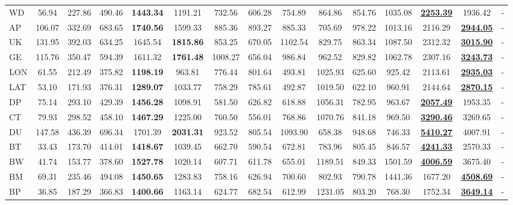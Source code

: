 \begin{table*}[htbp]
\begin{tabular}{@{}l *{14}{c}@{}}
WD & 56.94 & 227.86 & 490.46 & \textbf{1443.34} & 1191.21 & 732.56 & 606.28 & 754.89 & 864.86 & 854.76 & 1035.08 & \underline{\textbf{2253.39}} & 1936.42 & - \\
AP & 106.07 & 332.69 & 683.65 & \textbf{1740.56} & 1599.33 & 885.36 & 893.27 & 885.33 & 705.69 & 978.22 & 1013.16 & 2116.29 & \underline{\textbf{2944.05}} & - \\
UK & 131.95 & 392.03 & 634.25 & 1645.54 & \textbf{1815.86} & 853.25 & 670.05 & 1102.54 & 829.75 & 863.34 & 1087.50 & 2312.32 & \underline{\textbf{3015.90}} & - \\
GE & 115.76 & 350.47 & 594.39 & 1611.32 & \textbf{1761.48} & 1008.27 & 656.04 & 986.84 & 962.52 & 829.82 & 1062.78 & 2307.16 & \underline{\textbf{3243.73}} & - \\
LON & 61.55 & 212.49 & 375.82 & \textbf{1198.19} & 963.81 & 776.44 & 801.64 & 493.81 & 1025.93 & 625.60 & 925.42 & 2113.61 & \underline{\textbf{2935.03}} & - \\
LAT & 53.10 & 171.93 & 376.31 & \textbf{1289.07} & 1033.77 & 758.29 & 785.61 & 492.87 & 1019.50 & 622.10 & 960.91 & 2144.64 & \underline{\textbf{2870.15}} & - \\
DP & 75.14 & 293.10 & 429.39 & \textbf{1456.28} & 1098.91 & 581.50 & 626.82 & 618.88 & 1056.31 & 782.95 & 963.67 & \underline{\textbf{2057.49}} & 1953.35 & - \\
CT & 79.93 & 298.52 & 458.10 & \textbf{1467.29} & 1225.00 & 760.50 & 556.01 & 768.86 & 1070.76 & 841.18 & 969.50 & \underline{\textbf{3290.46}} & 3269.65 & - \\
DU & 147.58 & 436.39 & 696.34 & 1701.39 & \textbf{2031.31} & 923.52 & 805.54 & 1093.90 & 658.38 & 948.68 & 746.33 & \underline{\textbf{5410.27}} & 4007.91 & - \\
BT & 33.43 & 173.70 & 414.01 & \textbf{1418.67} & 1039.45 & 662.70 & 590.54 & 672.81 & 783.96 & 805.45 & 846.57 & \underline{\textbf{4241.33}} & 2570.33 & - \\
BW & 41.74 & 153.77 & 378.60 & \textbf{1527.78} & 1020.14 & 607.71 & 611.78 & 655.01 & 1189.51 & 849.33 & 1501.59 & \underline{\textbf{4006.59}} & 3675.40 & - \\
BM & 69.31 & 235.46 & 494.08 & \textbf{1450.65} & 1283.83 & 758.16 & 626.94 & 700.60 & 802.93 & 790.78 & 1441.36 & 1677.20 & \underline{\textbf{4508.69}} & - \\
BP & 36.85 & 187.29 & 366.83 & \textbf{1400.66} & 1163.14 & 624.77 & 682.54 & 612.99 & 1231.05 & 803.20 & 768.30 & 1752.34 & \underline{\textbf{3649.14}} & - \\

\end{tabular}
\end{table*}
